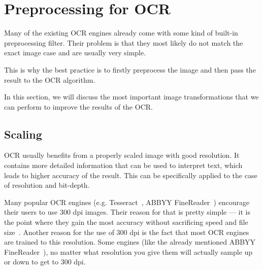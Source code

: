 \section{Preprocessing for OCR}

Many of the existing OCR engines already come with some kind of built-in preprocessing filter. Their problem is that they most likely do not match the exact image case and are usually very simple.

This is why the best practice is to firstly preprocess the image and then pass the result to the OCR algorithm.

In this section, we will discuss the most important image transformations that we can perform to improve the results of the OCR. 

\subsection{Scaling}

OCR usually benefits from a properly scaled image with good resolution. It contains more detailed information that can be used to interpret text, which leads to higher accuracy of the result. This can be specifically applied to the case of resolution and bit-depth.

Many popular OCR engines (e.g. Tesseract~\cite{TesseractQual}, ABBYY FineReader~\cite{ABBYYdpi}) encourage their users to use 300 dpi images. Their reason for that is pretty simple --- it is the point where they gain the most accuracy without sacrificing speed and file size~\cite{preprocessAll}. Another reason for the use of 300 dpi is the fact that most OCR engines are trained to this resolution. Some engines (like the already mentioned ABBYY FineReader~\cite{ABBYYdpi}), no matter what resolution you give them will actually sample up or down to get to 300 dpi. 

